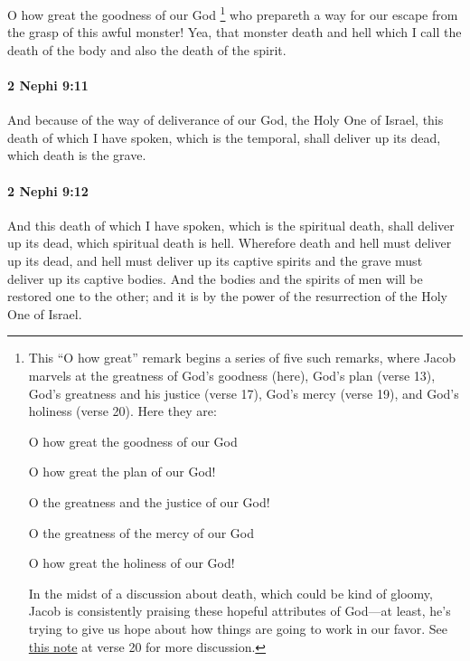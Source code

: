 			O how great the goodness of our God%
				\footnote{%
					\label{2NEPHI-9-10-o}%
					This ``O how great'' remark begins a series of five such remarks, where Jacob marvels at the greatness of God's goodness (here), God's plan (verse 13), God's greatness and his justice (verse 17), God's mercy (verse 19), and God's holiness (verse 20). Here they are:
						\begin{compactdesc}
							\item[Verse 10] O how great the goodness of our God
							\item[Verse 13] O how great the plan of our God!
							\item[Verse 17] O the greatness and the justice of our God!
							\item[Verse 19] O the greatness of the mercy of our God
							\item[Verse 20] O how great the holiness of our God!
						\end{compactdesc}
					In the midst of a discussion about death, which could be kind of gloomy, Jacob is consistently praising these hopeful attributes of God---at least, he's trying to give us hope about how things are going to work in our favor. See \hyperref[2NEPHI-9-20-knoweth]{this note} at verse 20 for more discussion.
					}
			who prepareth a way for our escape from the grasp of this awful monster!
			Yea, that monster death and hell
			which I call the death of the body and also the death of the spirit.

		\paragraph{2 Nephi 9:11} %
			\label{2NEPHI-9-11}

			And because of the way of deliverance of our God, the Holy One of Israel,
			this death of which I have spoken, which is the temporal,
			shall deliver up its dead, which death is the grave.

		\paragraph{2 Nephi 9:12} %
			\label{2NEPHI-9-12}

			And this death of which I have spoken, which is the spiritual death,
			shall deliver up its dead, which spiritual death is hell.
			Wherefore death and hell must deliver up its dead,
			and hell must deliver up its captive spirits
			and the grave must deliver up its captive bodies.
			And the bodies and the spirits of men will be restored one to the other;
			and it is by the power of the resurrection of the Holy One of Israel.

